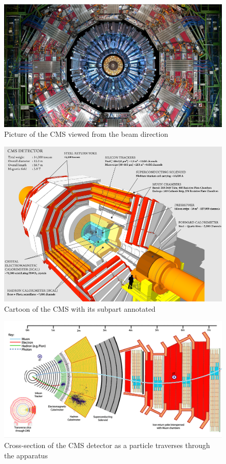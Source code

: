 \begin{figure}[h!]
	\caption{Picture of the CMS viewed from the beam direction \cite{det}}
  \label{fig:cms}
  \centering
  \includegraphics[width=0.9\linewidth]{figs/cms.png}
\end{figure}

\begin{figure}[h!]
	\caption{Cartoon of the CMS with its subpart annotated \cite{xsec}}
  \label{fig:CMS}
  \centering
  \includegraphics[width=0.87\linewidth]{figs/CMS.png}
\end{figure}


\begin{figure}[h!]
  \caption{Cross-section of the CMS detector as a particle traverses through the apparatus \cite{xsec}}
  \label{fig:cmsxsec}
  \centering
  \includegraphics[width=0.87\linewidth]{figs/cmsxsec.png}
\end{figure}

